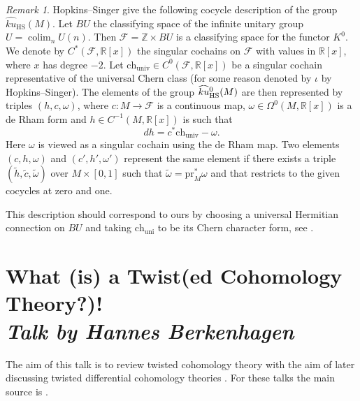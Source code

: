 \documentclass[a4paper]{book}
\newcommand{\lF}{\mathcal{F}}
\newcommand{\bR}{\mathbb{R}}
\newcommand{\bZ}{\mathbb{Z}}
\newcommand{\ch}{\mathrm{ch}}
\DeclareMathOperator*\colim{colim} %
\theoremstyle{definition}
\theoremstyle{remark}
\newtheorem{remark}[equation]{Remark}
\numberwithin{equation}{section}
\begin{document}
\begin{remark}
Hopkins--Singer \cite{hopkinssinger2005diffcoh} give the following cocycle description of the group $\widehat{ku}_{\mathrm{HS}}(M)$. Let $BU$ the classifying space of the infinite unitary group $U = \colim_n U(n)$. Then $\lF = \bZ \times BU$ is a classifying space for the functor $K^0$. We denote by $C^*(\lF, \bR[x])$ the singular cochains on $\lF$ with values in $\bR[x]$, where $x$ has degree $-2$. Let $\ch_{\mathrm{univ}} \in C^0(\lF, \bR[x])$ be a singular cochain representative of the universal Chern class (for some reason denoted by $\iota$ by Hopkins--Singer). The elements of the group $\smash{\widehat{ku}}{}^0_{\mathrm{HS}}(M)$ are then represented by triples $(h, c, \omega)$, where   $c: M \to \lF$ is a continuous map, $\omega \in \Omega^0(M, \bR[x])$ is a de Rham form and $h \in C^{-1}(M, \bR[x])$ is such that
\[
dh = c^*\ch_{\mathrm{univ}} - \omega.
\]
Here $\omega$ is viewed as a singular cochain using the de Rham map. Two elements $(c, h, \omega)$ and $(c', h', \omega')$ represent the same element if there exists a triple $(\tilde{h}, \tilde{c}, \tilde{\omega})$ over $M \times [0, 1]$ such that $\tilde{\omega} = \mathrm{pr}_M^*\omega$ and that restricts to the given cocycles at zero and one.

This description should correspond to ours by choosing a universal Hermitian connection on $BU$ and taking $\ch_{\mathrm{uni}}$ to be its Chern character form, see \cite{narasimhanramanan1961universalconnections}.
\end{remark}

\chapter{What (is) a Twist(ed Cohomology Theory?)! \texorpdfstring{\\}{ } \normalsize \emph{Talk by Hannes Berkenhagen}}

The aim of this talk is to review twisted cohomology theory with the aim of later discussing twisted differential cohomology theories \cite{bunkegepner2021differential}. For these talks the main source is \cite{abghr2014infty,abg2018thom}.
\end{document}
